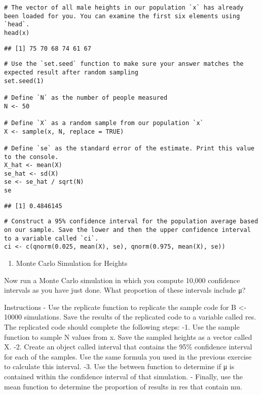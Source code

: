 \documentclass[
]{article}
\providecommand{\tightlist}{%
  \setlength{\itemsep}{0pt}\setlength{\parskip}{0pt}}
\begin{document}
\begin{verbatim}
# The vector of all male heights in our population `x` has already been loaded for you. You can examine the first six elements using `head`.
head(x)
\end{verbatim}

\begin{verbatim}
## [1] 75 70 68 74 61 67
\end{verbatim}

\begin{verbatim}
# Use the `set.seed` function to make sure your answer matches the expected result after random sampling
set.seed(1)

# Define `N` as the number of people measured
N <- 50

# Define `X` as a random sample from our population `x`
X <- sample(x, N, replace = TRUE)

# Define `se` as the standard error of the estimate. Print this value to the console.
X_hat <- mean(X)
se_hat <- sd(X)
se <- se_hat / sqrt(N)
se
\end{verbatim}

\begin{verbatim}
## [1] 0.4846145
\end{verbatim}

\begin{verbatim}
# Construct a 95% confidence interval for the population average based on our sample. Save the lower and then the upper confidence interval to a variable called `ci`.
ci <- c(qnorm(0.025, mean(X), se), qnorm(0.975, mean(X), se))
\end{verbatim}

\begin{enumerate}
\def\labelenumi{\arabic{enumi}.}
\setcounter{enumi}{4}
\tightlist
\item
  Monte Carlo Simulation for Heights
\end{enumerate}

Now run a Monte Carlo simulation in which you compute 10,000 confidence
intervals as you have just done. What proportion of these intervals
include μ?

Instructions - Use the replicate function to replicate the sample code
for B \textless- 10000 simulations. Save the results of the replicated
code to a variable called res. The replicated code should complete the
following steps: -1. Use the sample function to sample N values from x.
Save the sampled heights as a vector called X. -2. Create an object
called interval that contains the 95\% confidence interval for each of
the samples. Use the same formula you used in the previous exercise to
calculate this interval. -3. Use the between function to determine if μ
is contained within the confidence interval of that simulation. -
Finally, use the mean function to determine the proportion of results in
res that contain mu.
\end{document}
